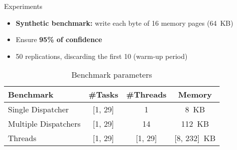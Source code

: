 	\begin{frame}[fragile, t]{Experiments}
		\begin{itemize}
			\setlength\itemsep{4mm}
			\item \textbf{Synthetic benchmark:} write each byte of 16 memory pages (64~KB)
			\item Ensure \textbf{95\% of confidence}
			\item 50 replications, discarding the first 10 (warm-up period)
		\end{itemize}
		
		\vspace{4mm}

		\begin{table}
		\centering
			\begin{tabular}{lccc}
			\toprule
					\textbf{Benchmark}   & \textbf{\#Tasks} & \textbf{\#Threads} & \textbf{Memory} \\
					\midrule
					Single Dispatcher    & [1, 29]          & 1                  & 8~KB            \\
					Multiple Dispatchers & [1, 29]          & 14                 & 112~KB          \\
					Threads              & [1, 29]          & [1, 29]            & [8, 232]~KB     \\
					\bottomrule
			\end{tabular}
			\caption{Benchmark parameters}
		\end{table}
	\end{frame}

